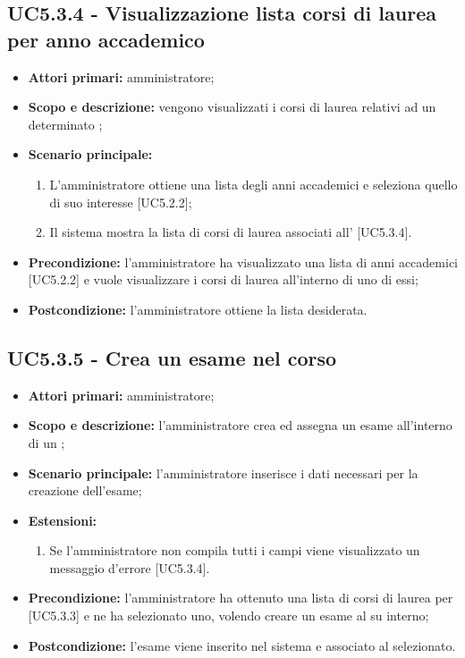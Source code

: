 \documentclass[AnalisiDeiRequisiti.tex]{subfiles}
\begin{document}
\subsection{UC5.3.4 - Visualizzazione lista corsi di laurea per anno accademico}
\begin{itemize}
	\item \textbf{Attori primari:} amministratore;
	\item \textbf{Scopo e descrizione:} vengono visualizzati i corsi di laurea relativi ad un determinato ;
	\item \textbf{Scenario principale:}
	\begin{enumerate}
		\item L'amministratore ottiene una lista degli anni accademici e seleziona quello di suo interesse [UC5.2.2];
		\item Il sistema mostra la lista di corsi di laurea associati all' [UC5.3.4].
	\end{enumerate}
	\item \textbf{Precondizione:} l'amministratore ha visualizzato una lista di anni accademici [UC5.2.2] e vuole visualizzare i corsi di laurea all'interno di uno di essi; 
	\item \textbf{Postcondizione:} l'amministratore ottiene la lista desiderata.
\end{itemize}
\subsection{UC5.3.5 - Crea un esame nel corso}
\begin{itemize}
	\item \textbf{Attori primari:} amministratore;
	\item \textbf{Scopo e descrizione:} l'amministratore crea ed assegna un esame all'interno di un ;
	\item \textbf{Scenario principale:} l'amministratore inserisce i dati necessari per la creazione dell'esame;
	\item \textbf{Estensioni:}
	\begin{enumerate}
		\item Se l'amministratore non compila tutti i campi viene visualizzato un messaggio d'errore [UC5.3.4].
	\end{enumerate}
	\item \textbf{Precondizione:} l'amministratore ha ottenuto una lista di corsi di laurea per  [UC5.3.3] e ne ha selezionato uno, volendo creare un esame al su interno; 
	\item \textbf{Postcondizione:} l'esame viene inserito nel sistema e associato al  selezionato.
\end{itemize}
\end{document}
